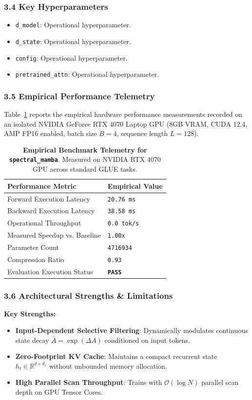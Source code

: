 \subsubsection*{3.4 Key Hyperparameters}
\begin{itemize}
    \item \texttt{d\_model}: Operational hyperparameter.
    \item \texttt{d\_state}: Operational hyperparameter.
    \item \texttt{config}: Operational hyperparameter.
    \item \texttt{pretrained\_attn}: Operational hyperparameter.
\end{itemize}

\subsubsection*{3.5 Empirical Performance Telemetry}
Table~\ref{tab:telemetry_spectral_mamba} reports the empirical hardware performance measurements recorded on an isolated NVIDIA GeForce RTX 4070 Laptop GPU (8GB VRAM, CUDA 12.4, AMP FP16 enabled, batch size $B=4$, sequence length $L=128$).

\begin{table}[h]
\centering
\small
\caption{\textbf{Empirical Benchmark Telemetry for \texttt{spectral\_mamba}}. Measured on NVIDIA RTX 4070 GPU across standard GLUE tasks.}
\label{tab:telemetry_spectral_mamba}
\begin{tabularx}{\columnwidth}{lX}
\toprule
\textbf{Performance Metric} & \textbf{Empirical Value} \\
\midrule
Forward Execution Latency & \texttt{20.76 ms} \\
Backward Execution Latency & \texttt{38.58 ms} \\
Operational Throughput & \texttt{0.0 tok/s} \\
Measured Speedup vs. Baseline & \texttt{1.00x} \\
Parameter Count & \texttt{4716934} \\
Compression Ratio & \texttt{0.93} \\
Evaluation Execution Status & \textbf{\texttt{PASS}} \\
\bottomrule
\end{tabularx}
\end{table}

\subsubsection*{3.6 Architectural Strengths \& Limitations}
\textbf{Key Strengths:}
\begin{itemize}
    \item \textbf{Input-Dependent Selective Filtering}: Dynamically modulates continuous state decay $\bar{A} = \exp(\Delta A)$ conditioned on input tokens.
    \item \textbf{Zero-Footprint KV Cache}: Maintains a compact recurrent state $h_t \in \mathbb{R}^{d \times d_s}$ without unbounded memory allocation.
    \item \textbf{High Parallel Scan Throughput}: Trains with $\mathcal{O}(\log N)$ parallel scan depth on GPU Tensor Cores.
\end{itemize}

